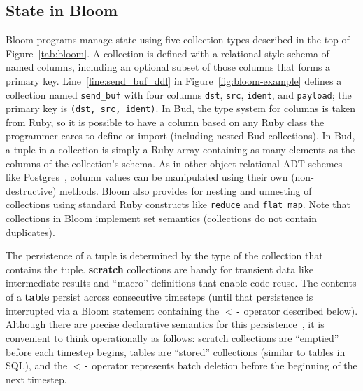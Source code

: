 \subsection{State in Bloom}
Bloom programs manage state using five collection types described in the top of
Figure~\ref{tab:bloom}. A collection is defined with a relational-style schema
of named columns, including an optional subset of those columns that forms a
primary key. Line~\ref{line:send_buf_ddl} in Figure~\ref{fig:bloom-example}
defines a collection named \texttt{send\_buf} with four columns \texttt{dst},
\texttt{src}, \texttt{ident}, and \texttt{payload}; the primary key is
\texttt{(dst,~src,~ident)}. In Bud, the type system for columns is taken from
Ruby, so it is possible to have a column based on any Ruby class the programmer
cares to define or import (including nested Bud collections).  In Bud, a tuple
in a collection is simply a Ruby array containing as many elements as the
columns of the collection's schema.  As in other object-relational ADT schemes
like Postgres~\cite{postgres-adt}, column values can be manipulated using their
own (non-destructive) methods. Bloom also provides for nesting and unnesting of
collections using standard Ruby constructs like \texttt{reduce} and
\texttt{flat\_map}. Note that collections in Bloom implement set semantics
(collections do not contain duplicates).

The persistence of a tuple is determined by the type of the collection that
contains the tuple. \textbf{scratch} collections are handy for transient data
like intermediate results and ``macro'' definitions that enable code reuse. The
contents of a \textbf{table} persist across consecutive timesteps (until that
persistence is interrupted via a Bloom statement containing the \texttt{$<$-}
operator described below). Although there are precise declarative semantics for
this persistence~\cite{dedalus}, it is convenient to think operationally as
follows: scratch collections are ``emptied'' before each timestep begins, tables
are ``stored'' collections (similar to tables in SQL), and the \texttt{$<$-}
operator represents batch deletion before the beginning of the next timestep.

